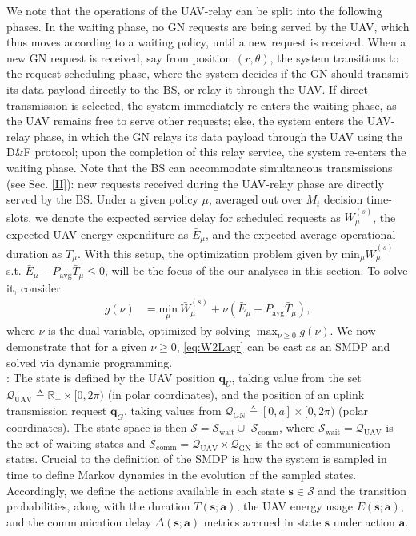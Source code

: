 \documentclass[10pt,twocolumn]{IEEEtran}
\begin{document}
We note that the operations of the UAV-relay can be split into the following phases. In the waiting phase, no GN requests are being served by the UAV, which thus moves according to a waiting policy, until a new request is received. When a new GN request is received, say from position $(r,\theta)$, the system transitions to the request scheduling phase, where the system decides if the GN should transmit its data payload directly to the BS, or relay it through the UAV. If direct transmission is selected, the system immediately re-enters the waiting phase, as the UAV remains free to serve other requests; else, the system enters the UAV-relay phase, in which the GN relays its data payload through the UAV using the D\&F protocol; upon the completion of this relay service, the system re-enters the waiting phase. Note that the BS can accommodate simultaneous transmissions (see Sec. \ref{II}): new requests received during the UAV-relay phase are directly served by the BS. Under a given policy $\mu$, averaged out over $M_{t}$ decision time-slots, we denote the expected service delay for scheduled requests as $\bar{W}_{\mu}^{(s)}$, the expected UAV energy expenditure as $\bar{E}_{\mu}$, and the expected average operational duration as $\bar{T}_{\mu}$. With this setup, the optimization problem given by ${\mathrm{min}}_{\mu}\bar{W}_{\mu}^{(s)}$ s.t. $\bar{E}_{\mu}{-}P_{\mathrm{avg}}\bar{T}_{\mu}{\leq}0$, will be the focus of the our analyses in this section. To solve it, consider
\begin{align}\label{eq:W2Lagr}
    g(\nu)&{=}\underset{\mu}{\mathrm{min}}\ \bar{W}_{\mu}^{(s)} + \nu (\bar{E}_{\mu}-P_{\mathrm{avg}}\bar{T}_{\mu}),
\end{align}
where $\nu$ is the dual variable, optimized by solving $\max_{\nu{\geq}0}g(\nu)$. We now demonstrate that for a given $\nu{\geq}0$, \eqref{eq:W2Lagr} can be cast as an SMDP and solved via dynamic programming.\\
: The state is defined by the UAV position $\mathbf{q}_{U}$, taking value from the set $\mathcal{Q}_{\mathrm{UAV}}\triangleq\mathbb{R}_{+}\times[0,2\pi)$ (in polar coordinates), and the position of an uplink transmission request $\mathbf{q}_G$, taking values from $\mathcal{Q}_{\mathrm{GN}}{\triangleq}[0,a]{\times}[0,2\pi)$ (polar coordinates). The state space is then $\mathcal{S}{=}\mathcal{S}_{\mathrm{wait}}{\cup}$ $\mathcal{S}_{\mathrm{comm}}$, where $\mathcal{S}_{\mathrm{wait}}{=}\mathcal{Q}_{\mathrm{UAV}}$ is the set of waiting states and $\mathcal{S}_{\mathrm{comm}}{=}\mathcal{Q}_{\mathrm{UAV}}{\times}\mathcal{Q}_{\mathrm{GN}}$ is the set of communication states. Crucial to the definition of the SMDP is how the system is sampled in time to define Markov dynamics in the evolution of the sampled states. Accordingly, we define the actions available in each state $\mathbf{s}{\in}\mathcal{S}$ and the transition probabilities, along with the duration $T(\mathbf{s};\mathbf{a})$, the UAV energy usage $E(\mathbf{s};\mathbf{a})$, and the communication delay $\Delta(\mathbf{s};\mathbf{a})$ metrics accrued in state $\mathbf{s}$ under action $\mathbf{a}$.\\
\end{document}

